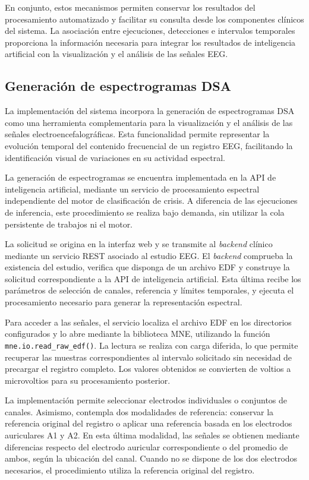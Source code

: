 En conjunto, estos mecanismos permiten conservar los
resultados del procesamiento automatizado y facilitar
su consulta desde los componentes clínicos del sistema.
La asociación entre ejecuciones, detecciones e intervalos
temporales proporciona la información necesaria para
integrar los resultados de inteligencia artificial
con la visualización y el análisis de las señales EEG.

\subsection{Generación de espectrogramas DSA}

La implementación del sistema incorpora la generación de
espectrogramas DSA como
una herramienta complementaria para la visualización y el
análisis de las señales electroencefalográficas. Esta
funcionalidad permite representar la evolución temporal
del contenido frecuencial de un registro EEG, facilitando
la identificación visual de variaciones en su actividad
espectral.

La generación de espectrogramas se encuentra implementada
en la API de inteligencia artificial, mediante un servicio
de procesamiento espectral independiente del motor de
clasificación de crisis. A diferencia de las ejecuciones
de inferencia, este procedimiento se realiza bajo demanda,
sin utilizar la cola persistente de trabajos ni el motor.

La solicitud se origina en la interfaz web y se transmite
al \textit{backend} clínico mediante un servicio REST asociado al
estudio EEG. El \textit{backend} comprueba la existencia del estudio,
verifica que disponga de un archivo EDF y construye la
solicitud correspondiente a la API de inteligencia
artificial. Esta última recibe los parámetros de selección
de canales, referencia y límites temporales, y ejecuta
el procesamiento necesario para generar la representación
espectral.

Para acceder a las señales, el servicio localiza el archivo
EDF en los directorios configurados y lo abre mediante
la biblioteca MNE, utilizando la función
\texttt{mne.io.read\_raw\_edf()}. La lectura se realiza
con carga diferida, lo que permite recuperar las muestras
correspondientes al intervalo solicitado sin necesidad
de precargar el registro completo. Los valores obtenidos
se convierten de voltios a microvoltios para su
procesamiento posterior.

La implementación permite seleccionar electrodos
individuales o conjuntos de canales. Asimismo, contempla
dos modalidades de referencia: conservar la referencia
original del registro o aplicar una referencia basada
en los electrodos auriculares A1 y A2. En esta última
modalidad, las señales se obtienen mediante diferencias
respecto del electrodo auricular correspondiente o del
promedio de ambos, según la ubicación del canal. Cuando
no se dispone de los dos electrodos necesarios, el
procedimiento utiliza la referencia original del registro.

